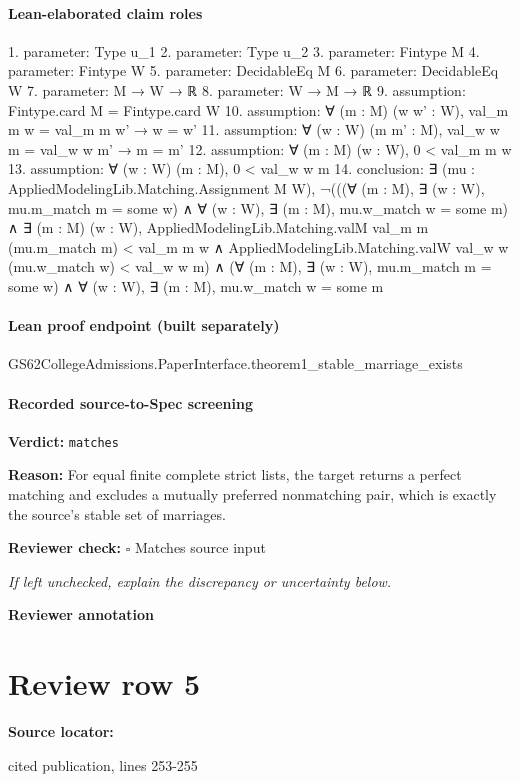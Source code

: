\documentclass[10pt]{article}
\newcommand{\reviewerbox}{%
  \par\noindent\fbox{\parbox{0.96\linewidth}{\rule{0pt}{0.38in}}}\par
}
\newcommand{\reviewmatch}[1]{%
  \par\noindent\textbf{Reviewer check:} $\square$\; #1\par
  \noindent\emph{If left unchecked, explain the discrepancy or uncertainty below.}\par
}
\begin{document}
\paragraph{Lean-elaborated claim roles}\begin{ReviewVerbatim}
1. parameter: Type u_1
2. parameter: Type u_2
3. parameter: Fintype M
4. parameter: Fintype W
5. parameter: DecidableEq M
6. parameter: DecidableEq W
7. parameter: M → W → ℝ
8. parameter: W → M → ℝ
9. assumption: Fintype.card M = Fintype.card W
10. assumption: ∀ (m : M) (w w' : W), val_m m w = val_m m w' → w = w'
11. assumption: ∀ (w : W) (m m' : M), val_w w m = val_w w m' → m = m'
12. assumption: ∀ (m : M) (w : W), 0 < val_m m w
13. assumption: ∀ (w : W) (m : M), 0 < val_w w m
14. conclusion: ∃ (mu : AppliedModelingLib.Matching.Assignment M W),
  ¬(((∀ (m : M), ∃ (w : W), mu.m_match m = some w) ∧ ∀ (w : W), ∃ (m : M), mu.w_match w = some m) ∧
        ∃ (m : M) (w : W),
          AppliedModelingLib.Matching.valM val_m m (mu.m_match m) < val_m m w ∧
            AppliedModelingLib.Matching.valW val_w w (mu.w_match w) < val_w w m) ∧
    (∀ (m : M), ∃ (w : W), mu.m_match m = some w) ∧ ∀ (w : W), ∃ (m : M), mu.w_match w = some m
\end{ReviewVerbatim}

\paragraph{Lean proof endpoint (built separately)}\begin{ReviewVerbatim}
GS62CollegeAdmissions.PaperInterface.theorem1_stable_marriage_exists
\end{ReviewVerbatim}

\paragraph{Recorded source-to-Spec screening}
\textbf{Verdict:} \texttt{matches}
\\
{\raggedright
\textbf{Reason:} For equal finite complete strict lists, the target returns a perfect matching and excludes a mutually preferred nonmatching pair, which is exactly the source's stable set of marriages.\allowbreak{}
\par}
\reviewmatch{Matches source input}
\noindent\textbf{Reviewer annotation}\par
\reviewerbox
\clearpage
\hypertarget{source-claim-5b11dd2478126734}{}
\section*{Review row 5}
\textbf{Source locator:} {\footnotesize\raggedright cited publication, lines 253-\allowbreak{}255\par}
\end{document}
